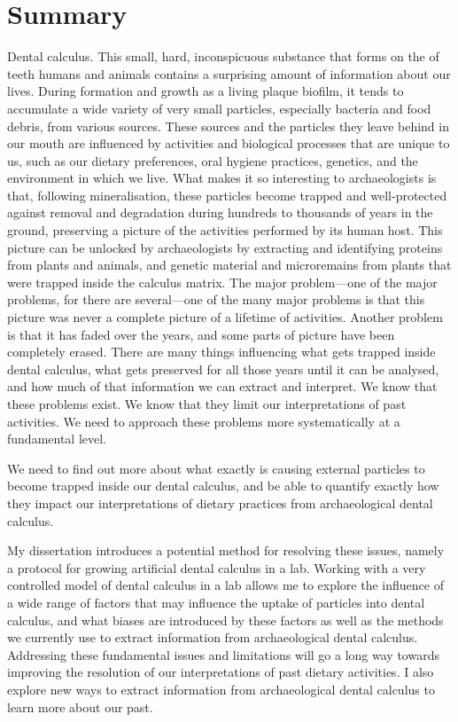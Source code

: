 \documentclass[
  letterpaper,
]{book}
\begin{document}
\hypertarget{summary-6}{%
\chapter*{Summary}\label{summary-6}}


Dental calculus. This small, hard, inconspicuous substance that forms on
the of teeth humans and animals contains a surprising amount of
information about our lives. During formation and growth as a living
plaque biofilm, it tends to accumulate a wide variety of very small
particles, especially bacteria and food debris, from various sources.
These sources and the particles they leave behind in our mouth are
influenced by activities and biological processes that are unique to us,
such as our dietary preferences, oral hygiene practices, genetics, and
the environment in which we live. What makes it so interesting to
archaeologists is that, following mineralisation, these particles become
trapped and well-protected against removal and degradation during
hundreds to thousands of years in the ground, preserving a picture of
the activities performed by its human host. This picture can be unlocked
by archaeologists by extracting and identifying proteins from plants and
animals, and genetic material and microremains from plants that were
trapped inside the calculus matrix. The major problem---one of the major
problems, for there are several---one of the many major problems is that
this picture was never a complete picture of a lifetime of activities.
Another problem is that it has faded over the years, and some parts of
picture have been completely erased. There are many things influencing
what gets trapped inside dental calculus, what gets preserved for all
those years until it can be analysed, and how much of that information
we can extract and interpret. We know that these problems exist. We know
that they limit our interpretations of past activities. We need to
approach these problems more systematically at a fundamental level.

We need to find out more about what exactly is causing external
particles to become trapped inside our dental calculus, and be able to
quantify exactly how they impact our interpretations of dietary
practices from archaeological dental calculus.

My dissertation introduces a potential method for resolving these
issues, namely a protocol for growing artificial dental calculus in a
lab. Working with a very controlled model of dental calculus in a lab
allows me to explore the influence of a wide range of factors that may
influence the uptake of particles into dental calculus, and what biases
are introduced by these factors as well as the methods we currently use
to extract information from archaeological dental calculus. Addressing
these fundamental issues and limitations will go a long way towards
improving the resolution of our interpretations of past dietary
activities. I also explore new ways to extract information from
archaeological dental calculus to learn more about our past.
\end{document}
